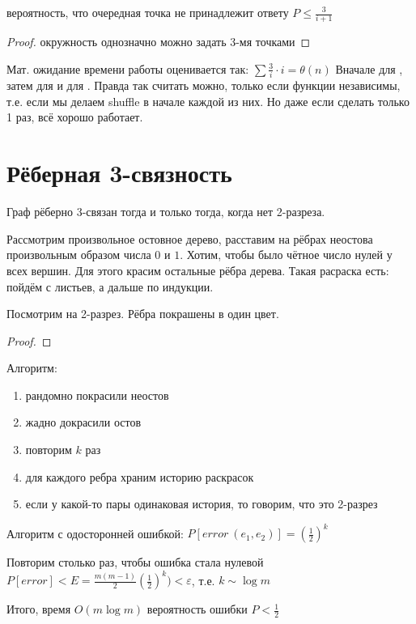\begin{lemma}
вероятность, что очередная точка не принадлежит ответу $P \leq \frac{3}{i+1}$
\end{lemma}

\begin{proof}
окружность однозначно можно задать 3-мя точками
\end{proof}

Мат. ожидание времени работы оценивается так: $\sum \frac{3}{i} \cdot i = \theta(n)$
Вначале для , затем для  и для .
Правда так считать можно, только если функции независимы, т.е. если
мы делаем shuffle в начале каждой из них. Но даже если сделать только 1 раз,
всё хорошо работает.

\section{Рёберная 3-связность}

Граф рёберно 3-связан тогда и только тогда, когда нет 2-разреза.

Рассмотрим произвольное остовное дерево, расставим на рёбрах
неостова произвольным образом числа $0$ и $1$. Хотим, чтобы было
чётное число нулей у всех вершин. Для этого красим остальные
рёбра дерева. Такая расраска есть: пойдём с листьев, а дальше по индукции.

\begin{assert}
    Посмотрим на 2-разрез. Рёбра покрашены в один цвет.
\end{assert}

\begin{proof}
    \TODO
\end{proof}

Алгоритм:
\begin{enumerate}
    \item рандомно покрасили неостов
    \item жадно докрасили остов
    \item повторим $k$ раз
    \item для каждого ребра храним историю раскрасок
    \item если у какой-то пары одинаковая история, то говорим, что это 2-разрез
\end{enumerate}

Алгоритм с одосторонней ошибкой: $P[error \ (e_1, e_2) ] = (\tfrac{1}{2})^k$

Повторим столько раз, чтобы ошибка стала нулевой 
$P[error] < E = \frac{m(m-1)}{2} (\tfrac{1}{2})^k) < \varepsilon$,
т.е. $k \sim \log m$

Итого, время $O(m \log m)$ вероятность ошибки $P < \frac{1}{2}$

